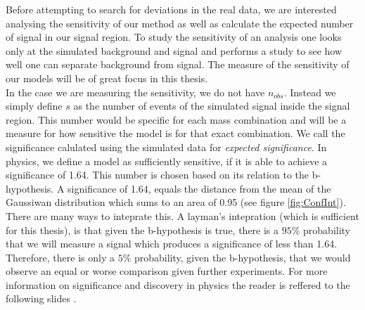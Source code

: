 Before attempting to search for deviations in the real data, we are interested analysing the sensitivity of our method as well 
as calculate the expected number of signal in our signal region. To study the sensitivity of an analysis one looks only at the 
simulated background and signal and performs a study to see how well one can separate background from signal. The measure of the sensitivity 
of our models will be of great focus in this thesis.
\\
In the case we are measuring the sensitivity, we do not have $n_{obs}$. Instead we simply define $s$ as the number of events of the simulated signal 
inside the signal region. This number would be specific for each mass combination and will be a measure for how sensitive 
the model is for that exact combination. We call the significance calulated using the simulated data for \emph{expected significance}. 
In physics, we define a model as sufficiently sensitive, if it is able to achieve a significance of 1.64. This number is chosen based on 
its relation to the b-hypothesis. A significance of 1.64, equals the distance from the mean of the Gaussiwan distribution which sums to an area of 
0.95 (see figure \ref{fig:ConfInt}). There are many ways to inteprate this. A layman's intepration (which is sufficient for this thesis), is 
that given the b-hypothesis is true, there is a $95\%$ probability that we will measure a signal which produces a significance of less than 
1.64. Therefore, there is only a $5\%$ probability, given the b-hypothesis, that we would observe an equal or worse comparison given further experiments. 
For more information on significance and discovery in physics the reader is reffered to the following slides \cite{magnar}.